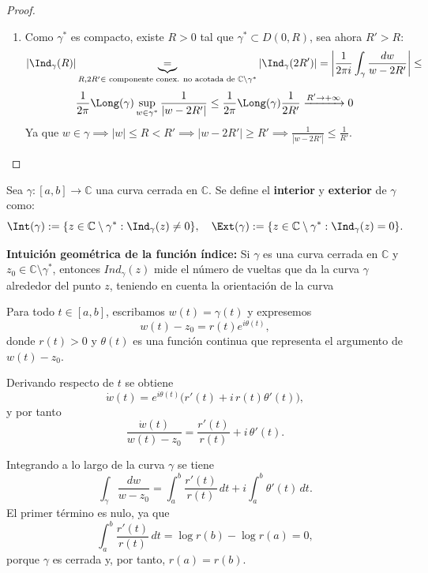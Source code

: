 \begin{proof}
\begin{enumerate}
\[        \]
        \[
        \Ind_\gamma \text{ es un unico valor de } \mathbb{Z} \implies
        \Ind_\gamma \text{ es constante en } \Omega
        \]
        \item Como $\gamma^*$ es compacto, existe $R > 0$ tal que $\gamma^* \subset D(0,R)$, sea ahora $R' > R$:
        \[
        \left| \Ind_\gamma (R) \right| \underbrace{=}_{R,2R' \in \text{ componente conex. no acotada de } \mathbb{C} \setminus \gamma^*}
        \left| \Ind_\gamma (2R') \right| =
        \left| \frac{1}{2 \pi i} \int_\gamma \frac{dw}{w - 2R'} \right| \leq
        \]
        \[
        \frac{1}{2 \pi} \Long (\gamma) \sup_{w \in \gamma^*} \frac{1}{|w - 2R'|} \leq
        \frac{1}{2 \pi} \Long (\gamma) \frac{1}{2R'} \xrightarrow{R' \to +\infty} 0
        \]
        Ya que $w \in \gamma \implies |w| \leq R < R' \implies |w - 2R'| \geq R' \implies \frac{1}{|w - 2R'|} \leq \frac{1}{R'}$.\\
    \end{enumerate}
\end{proof}

\begin{definición}
    Sea $\gamma : [a,b] \to \mathbb{C}$ una curva cerrada en $\mathbb{C}$. Se define el \textbf{interior} y \textbf{exterior} de $\gamma$ como:
    \[
        \Int(\gamma) := \{ z \in \mathbb{C} \setminus \gamma^* : \Ind_\gamma (z) \neq 0 \},
        \quad
        \Ext(\gamma) := \{ z \in \mathbb{C} \setminus \gamma^* : \Ind_\gamma (z) = 0 \}.
    \]
\end{definición}

\textbf{Intuición geométrica de la función índice:} Si $\gamma$ es una curva cerrada en $\mathbb{C}$ y $z_0 \in \mathbb{C} \setminus \gamma^*$, entonces $Ind_\gamma (z)$ mide el número de vueltas que da la curva $\gamma$ alrededor del punto $z$, teniendo en cuenta la orientación de la curva

Para todo $t \in [a,b]$, escribamos $w(t) = \gamma(t)$ y expresemos
\[
    w(t) - z_0 = r(t)e^{i\theta(t)},
\]
donde $r(t) > 0$ y $\theta(t)$ es una función continua que representa el argumento de $w(t) - z_0$.

Derivando respecto de $t$ se obtiene
\[
    \dot{w}(t) = e^{i\theta(t)}\big(r'(t) + i\,r(t)\theta'(t)\big),
\]
y por tanto
\[
    \frac{\dot{w}(t)}{w(t) - z_0} = \frac{r'(t)}{r(t)} + i\,\theta'(t).
\]

Integrando a lo largo de la curva $\gamma$ se tiene
\[
    \int_\gamma \frac{dw}{w - z_0}
    = \int_a^b \frac{r'(t)}{r(t)}\,dt + i \int_a^b \theta'(t)\,dt.
\]
El primer término es nulo, ya que
\[
    \int_a^b \frac{r'(t)}{r(t)}\,dt = \log r(b) - \log r(a) = 0,
\]
porque $\gamma$ es cerrada y, por tanto, $r(a)=r(b)$.

